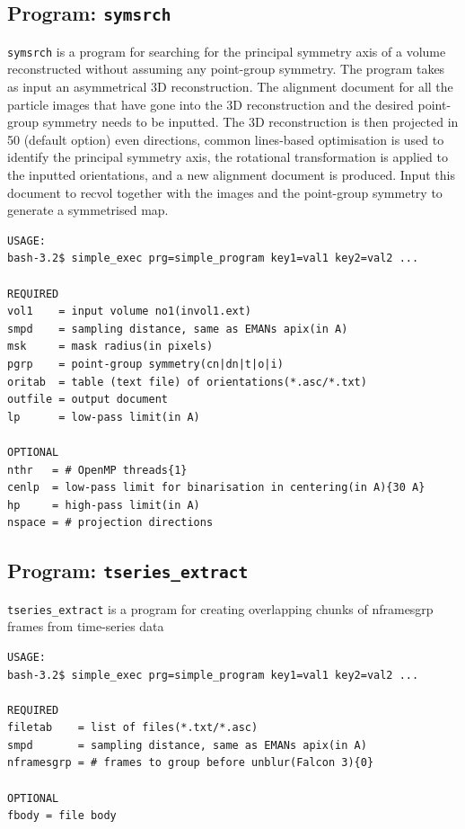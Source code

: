 \documentclass[a4paper,11pt]{article}
\newcommand{\prgname}[1]{\textcolor{NavyBlue}{\texttt{#1}}}
\begin{document}
\subsection{Program: \prgname{symsrch}}
\label{symsrch}
\prgname{symsrch} is a program for searching for the principal symmetry axis of a volume reconstructed without assuming any point-group symmetry. The program takes as input an asymmetrical 3D reconstruction. The alignment document for all the particle images that have gone into the 3D reconstruction and the desired point-group symmetry needs to be inputted. The 3D reconstruction is then projected in 50 (default option) even directions, common lines-based optimisation is used to identify the principal symmetry axis, the rotational transformation is applied to the inputted orientations, and a new alignment document is produced. Input this document to recvol together with the images and the point-group symmetry to generate a symmetrised map.

\begin{verbatim}
USAGE:
bash-3.2$ simple_exec prg=simple_program key1=val1 key2=val2 ...

REQUIRED
vol1    = input volume no1(invol1.ext)
smpd    = sampling distance, same as EMANs apix(in A)
msk     = mask radius(in pixels)
pgrp    = point-group symmetry(cn|dn|t|o|i)
oritab  = table (text file) of orientations(*.asc/*.txt)
outfile = output document
lp      = low-pass limit(in A)

OPTIONAL
nthr   = # OpenMP threads{1}
cenlp  = low-pass limit for binarisation in centering(in A){30 A}
hp     = high-pass limit(in A)
nspace = # projection directions
\end{verbatim}

\subsection{Program: \prgname{tseries\_extract}}
\label{tseries_extract}
\prgname{tseries\_extract} is a program for creating overlapping chunks of nframesgrp frames from time-series data 

\begin{verbatim}
USAGE:
bash-3.2$ simple_exec prg=simple_program key1=val1 key2=val2 ...

REQUIRED
filetab    = list of files(*.txt/*.asc)
smpd       = sampling distance, same as EMANs apix(in A)
nframesgrp = # frames to group before unblur(Falcon 3){0}

OPTIONAL
fbody = file body
\end{verbatim}
\end{document}
